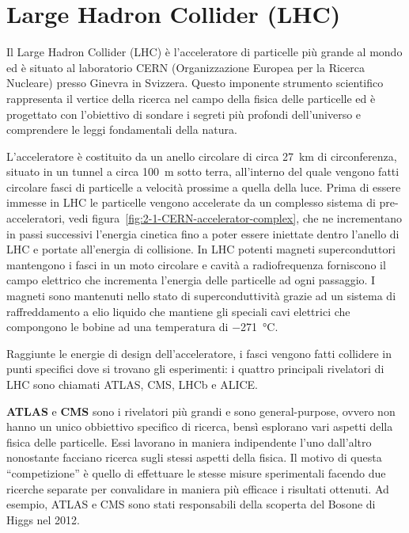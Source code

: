 \section{Large Hadron Collider (LHC)}
    Il Large Hadron Collider (LHC) è l’acceleratore di particelle più grande al mondo ed è situato al laboratorio CERN (Organizzazione Europea per la Ricerca Nucleare) presso Ginevra in Svizzera. Questo imponente strumento scientifico rappresenta il vertice della ricerca nel campo della fisica delle particelle ed è progettato con l’obiettivo di sondare i segreti più profondi dell’universo e comprendere le leggi fondamentali della natura.
    
    L’acceleratore è costituito da un anello circolare di circa \qty{27}{\kilo \meter} di circonferenza, situato in un tunnel a circa \qty{100}{\meter} sotto terra, all’interno del quale vengono fatti circolare fasci di particelle a velocità prossime a quella della luce. Prima di essere immesse in LHC le particelle vengono accelerate da un complesso sistema di pre-acceleratori, vedi figura~\ref{fig:2-1-CERN-accelerator-complex}, che ne incrementano in passi successivi l’energia cinetica fino a poter essere iniettate dentro l’anello di LHC e portate all’energia di collisione. In LHC potenti magneti superconduttori mantengono i fasci in un moto circolare e cavità a radiofrequenza forniscono il campo elettrico che incrementa l’energia delle particelle ad ogni passaggio. I magneti sono mantenuti nello stato di superconduttività grazie ad un sistema di raffreddamento a elio liquido che mantiene gli speciali cavi elettrici che compongono le bobine ad una temperatura di \qty{-271}{\degreeCelsius}.
    
    Raggiunte le energie di design dell'acceleratore, i fasci vengono fatti collidere in punti specifici dove si trovano gli esperimenti: i quattro principali rivelatori di LHC sono chiamati ATLAS, CMS, LHCb e ALICE.

    \textbf{ATLAS} e \textbf{CMS} sono i rivelatori più grandi e sono general-purpose, ovvero non hanno un unico obbiettivo specifico di ricerca, bensì esplorano vari aspetti della fisica delle particelle. Essi lavorano in maniera indipendente l’uno dall’altro nonostante facciano ricerca sugli stessi aspetti della fisica. Il motivo di questa ``competizione'' è quello di effettuare le stesse misure sperimentali facendo due ricerche separate per convalidare in maniera più efficace i risultati ottenuti. Ad esempio, ATLAS e CMS sono stati responsabili della scoperta del Bosone di Higgs nel 2012.

